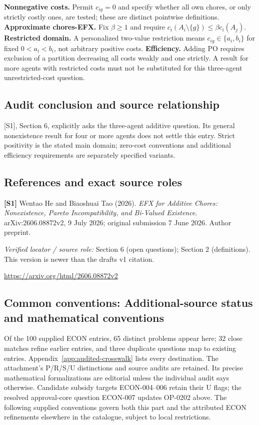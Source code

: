 \documentclass[11pt,a4paper]{article}
\begin{document}
\textbf{Nonnegative costs.} Permit $c_{ig}=0$ and specify whether all own chores, or only strictly costly ones, are tested; these are distinct pointwise definitions. \textbf{Approximate chores-EFX.} Fix $\beta\geq1$ and require $c_i(A_i\setminus\{g\})\leq\beta c_i(A_j)$. \textbf{Restricted domain.} A personalized two-value restriction means $c_{ig}\in\{a_i,b_i\}$ for fixed $0<a_i<b_i$, not arbitrary positive costs. \textbf{Efficiency.} Adding PO requires exclusion of a partition decreasing all costs weakly and one strictly. A result for more agents with restricted costs must not be substituted for this three-agent unrestricted-cost question.

\subsection*{Audit conclusion and source relationship}

[S1], Section 6, explicitly asks the three-agent additive question. Its general nonexistence result for four or more agents does not settle this entry. Strict positivity is the stated main domain; zero-cost conventions and additional efficiency requirements are separately specified variants.

\subsection*{References and exact source roles}

{\footnotesize\raggedright
\par\noindent\textbf{[S1]} Wentao He and Biaoshuai Tao (2026). \emph{EFX for Additive Chores: Nonexistence, Pareto Incompatibility, and Bi-Valued Existence}. arXiv:2606.08872v2, 9 July 2026; original submission 7 June 2026. Author preprint.\par \textit{Verified locator / source role:} Section 6 (open questions); Section 2 (definitions). This version is newer than the draft\textquotesingle s v1 citation.\par \url{https://arxiv.org/html/2606.08872v2}\par\smallskip
}

\subsection*{Common conventions: Additional-source status and mathematical conventions}

\label{audited:conventions}

Of the 100 supplied ECON entries, 65 distinct problems appear here; 32 close
matches refine earlier entries, and three duplicate questions map to existing
entries. Appendix~\ref{app:audited-crosswalk} lists every destination.
The attachment's P/R/S/U distinctions and source audits are retained. Its
precise mathematical formalizations are editorial unless the individual audit
says otherwise. Candidate subsidy targets ECON-004--006 retain their U flags;
the resolved approval-core question ECON-007 updates OP-0202 above.
The following supplied conventions govern both this part and the attributed
ECON refinements elsewhere in the catalogue, subject to local restrictions.
\end{document}

